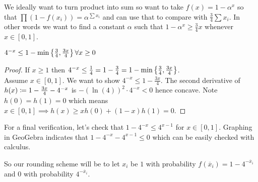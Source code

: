 \begin{enumerate}[label=(\alph*)]
{\color{gray} We ideally want to turn product into sum so want to take $f(x) = 1-\alpha^{x}$ so that $\prod(1-f(x_{i})) = \alpha^{\sum x_{i}}$ and can use that to compare with $\frac34\sum x_{i}$. In other words we want to find a constant $\alpha$ such that $1-\alpha^{x} \ge \frac34x$ whenever $x\in[0,1]$. 
}

\begin{lemma}
$4^{-x} \le 1-\min\left\{\frac34,\frac{3x}4\right\}\forall x\ge 0$
\end{lemma}
\begin{proof}
If $x\ge 1$ then $4^{-x}\le \frac14 = 1-\frac34 = 1-\min\left\{\frac34,\frac{3x}4\right\}$.\\
Assume $x\in [0,1]$. We want to show $4^{-x} \le 1-\frac{3x}4$. The second derivative of $h(x)\coloneqq 1-\frac{3x}{4}-4^{-x}$ is $-\left(\ln(4)\right)^{2}\cdot 4^{-x} <0$ hence concave. Note $h(0)=h(1)=0$ which means $x\in[0,1]\implies h(x) \ge xh(0)+(1-x)h(1) = 0$.
\end{proof}

For a final verification, let's check that $1-4^{-x}\le 4^{x-1}$ for $x\in [0,1]$. Graphing in GeoGebra indicates that $1-4^{-x}- 4^{x-1}\le0$ which can be easily checked with calculus.

So our rounding scheme will be to let $x_{i}$ be $1$ with probability $f(\overline x_{i}) = 1-4^{-\overline x_{i}}$ and $0$ with probability $4^{-\overline x_{i}}$. 
\end{enumerate}





